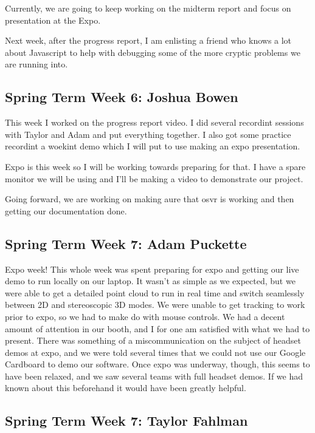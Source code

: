 \documentclass[draftclsnofoot,onecolumn]{IEEEtran}
\begin{document}
Currently, we are going to keep working on the midterm report and focus on presentation at the Expo.

Next week, after the progress report, I am enlisting a friend who knows a lot about Javascript to help with debugging some of the more cryptic problems we are running into.

\subsection{Spring Term Week 6: Joshua Bowen}

This week I worked on the progress report video. I did several recordint sessions with Taylor and Adam and put everything together. I also got some practice recordint a woekint demo which I will put to use making an expo presentation.

Expo is this week so I will be working towards preparing for that. I have a spare monitor we will be using and I'll be making a video to demonstrate our project.

Going forward, we are working on making aure that osvr is working and then getting our documentation done.

\subsection{Spring Term Week 7: Adam Puckette}

Expo week! This whole week was spent preparing for expo and getting our live demo to run locally on our laptop. It wasn't as simple as we expected, but we were able to get a detailed point cloud to run in real time and switch seamlessly between 2D and stereoscopic 3D modes. We were unable to get tracking to work prior to expo, so we had to make do with mouse controls. We had a decent amount of attention in our booth, and I for one am satisfied with what we had to present. There was something of a miscommunication on the subject of headset demos at expo, and we were told several times that we could not use our Google Cardboard to demo our software. Once expo was underway, though, this seems to have been relaxed, and we saw several teams with full headset demos. If we had known about this beforehand it would have been greatly helpful.

\subsection{Spring Term Week 7: Taylor Fahlman}
\end{document}

